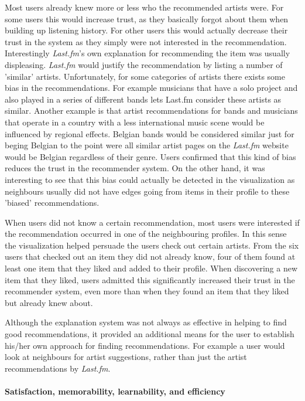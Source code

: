Most users already knew more or less who the recommended artists were. For some users this would increase trust, as they basically forgot about them when building up listening history. For other users this would actually decrease their trust in the system as they simply were not interested in the recommendation. Interestingly \emph{Last.fm}'s own explanation for recommending the item was usually displeasing. \emph{Last.fm} would justify the recommendation by listing a number of 'similar' artists. Unfortunately, for some categories of artists there exists some bias in the recommendations. For example musicians that have a solo project and also played in a series of different bands lets Last.fm consider these artists as similar. Another example is that artist recommendations for bands and musicians that operate in a country with a less international music scene would be influenced by regional effects. Belgian bands would be considered similar just for beging Belgian to the point were all similar artist pages on the \emph{Last.fm} website would be Belgian regardless of their genre. Users confirmed that this kind of bias reduces the trust in the recommender system. On the other hand, it was interesting to see that this bias could actually be detected in the visualization as neighbours usually did not have edges going from items in their profile to these 'biased' recommendations.

When users did not know a certain recommendation, most users were interested if the recommendation occurred in one of the neighbouring profiles. In this sense the visualization helped persuade the users check out certain artists. From the six users that checked out an item they did not already know, four of them found at least one item that they liked and added to their profile. When discovering a new item that they liked, users admitted this significantly increased their trust in the recommender system, even more than when they found an item that they liked but already knew about.

Although the explanation system was not always as effective in helping to find good recommendations, it provided an additional means for the user to establish his/her own approach for finding recommendations. For example a user would look at neighbours for artist suggestions, rather than just the artist recommendations by \emph{Last.fm}.



\paragraph{Satisfaction, memorability, learnability, and efficiency}


